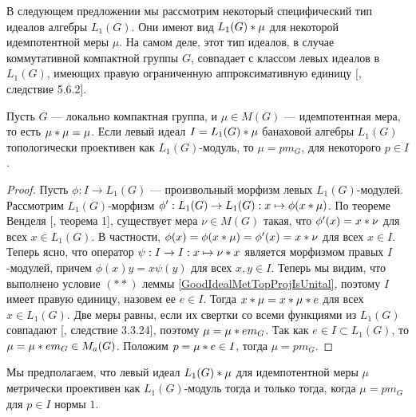 В следующем предложении мы рассмотрим некоторый специфический тип идеалов алгебры $L_1(G)$. Они имеют вид $L_1(G)\ast \mu$ для некоторой идемпотентной меры $\mu$. На самом деле, этот тип идеалов, в случае коммутативной компактной группы $G$, совпадает с классом левых идеалов в $L_1(G)$, имеющих правую ограниченную аппроксимативную единицу [\cite{KaniBanAlg}, следствие 5.6.2].

\begin{proposition}\label{CommIdealByIdemMeasL1MetTopProjCharac} Пусть $G$ --- локально компактная группа, и $\mu\in M(G)$ --- идемпотентная мера, то есть $\mu\ast\mu=\mu$. Если левый идеал $I=L_1(G)\ast\mu$ банаховой алгебры $L_1(G)$ топологически проективен как $L_1(G)$-модуль, то $\mu=p m_G$, для некоторого $p\in I$.
\end{proposition}
\begin{proof} Пусть $\phi:I\to L_1(G)$ --- произвольный морфизм левых $L_1(G)$-модулей. Рассмотрим $L_1(G)$-морфизм $\phi':L_1(G)\to L_1(G):x\mapsto\phi(x\ast\mu)$. По теореме Венделя [\cite{WendLeftCentrzrs}, теорема 1], существует мера $\nu\in M(G)$ такая, что $\phi'(x)=x\ast\nu$ для всех $x\in L_1(G)$. В частности, $\phi(x)=\phi(x\ast\mu)=\phi'(x)=x\ast\nu$ для всех $x\in I$. Теперь ясно, что оператор $\psi:I\to I:x\mapsto\nu\ast x$ является морфизмом правых $I$-модулей, причем $\phi(x)y=x\psi(y)$ для всех $x,y\in I$. Теперь мы видим, что выполнено условие $(**)$ леммы \ref{GoodIdealMetTopProjIsUnital}, поэтому $I$ имеет правую единицу, назовем ее $e\in I$. Тогда $x\ast\mu=x\ast\mu\ast e$ для всех $x\in L_1(G)$. Две меры равны, если их свертки со всеми функциями из $L_1(G)$ совпадают [\cite{DalBanAlgAutCont}, следствие 3.3.24], поэтому $\mu=\mu\ast e m_G$. Так как $e\in I\subset L_1(G)$, то $\mu=\mu\ast e m_G\in M_a(G)$. Положим $p=\mu\ast e\in I$, тогда $\mu=p m_G$.
\end{proof}

Мы предполагаем, что левый идеал $L_1(G)\ast \mu$ для идемпотентной меры $\mu$ метрически проективен как $L_1(G)$-модуль тогда и только тогда, когда $\mu=p m_G$ для $p\in I$ нормы $1$.


